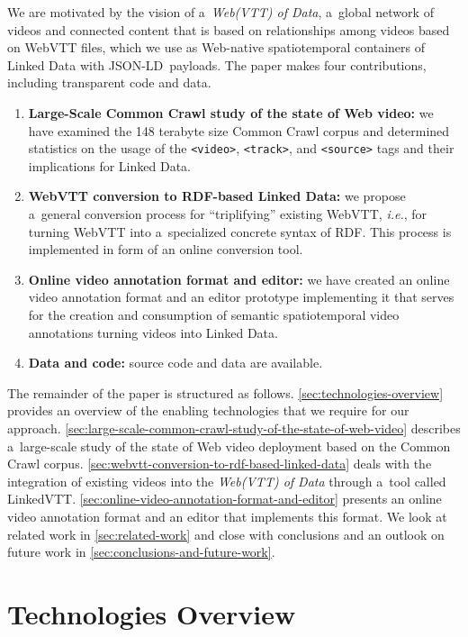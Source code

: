 \documentclass{sig-alternate}
\def\JSONLD{\mbox{JSON-LD}}
\begin{document}
We are motivated by the vision of a~\emph{Web(VTT) of Data},
a~global network of videos and connected content
that is based on relationships among videos based on WebVTT files,
which we use as Web-native spatiotemporal containers of Linked Data
with \JSONLD\ payloads.
The paper makes four contributions, including transparent code and data.

\begin{enumerate}[label=\textit{\roman*)},leftmargin=*]
  \item \textbf{Large-Scale Common Crawl study of the state of Web video:}
    we have examined the 148 terabyte size Common Crawl corpus
    and determined statistics on the usage of the \texttt{<video>},
    \texttt{<track>}, and \texttt{<source>} tags
    and their implications for Linked Data.
  \item \textbf{WebVTT conversion to RDF-based Linked Data:}
    we propose a~general conversion process for ``triplifying'' existing WebVTT,
    \emph{i.e.}, for turning WebVTT into a~specialized concrete syntax of RDF.
    This process is implemented in form of an online conversion tool.
  \item \textbf{Online video annotation format and editor:} we have created an
  online video annotation format and an editor prototype implementing it
  that serves for the creation
  and consumption of semantic spatiotemporal video annotations
  turning videos into Linked Data.
  \item \textbf{Data and code:} source code and data are available.
\end{enumerate}

The remainder of the paper is structured as follows.
\autoref{sec:technologies-overview} provides an overview
of the enabling technologies that we require for our approach.
\autoref{sec:large-scale-common-crawl-study-of-the-state-of-web-video}
describes a~large-scale study of the state of Web video deployment
based on the Common Crawl corpus.
\autoref{sec:webvtt-conversion-to-rdf-based-linked-data} deals with
the integration of existing videos into the \emph{Web(VTT) of Data}
through a~tool called LinkedVTT.
\autoref{sec:online-video-annotation-format-and-editor} presents
an online video annotation format and an editor that implements this format.
We look at related work in \autoref{sec:related-work} and close
with conclusions and an outlook on future work
in \autoref{sec:conclusions-and-future-work}.

\section{Technologies Overview}
\label{sec:technologies-overview}
\end{document}
